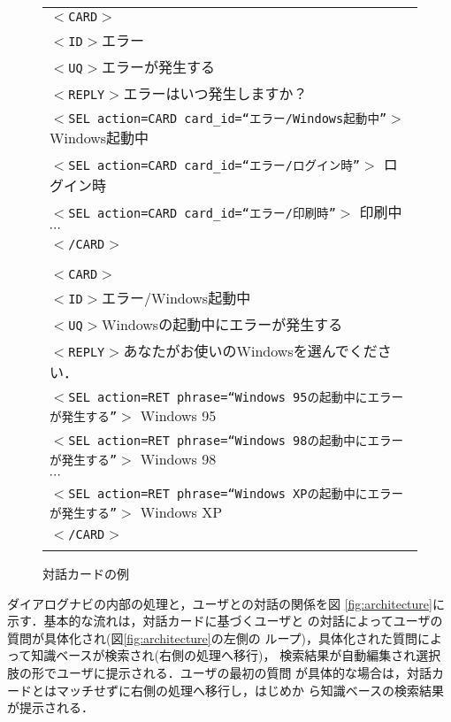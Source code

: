 \begin{itemize}
\begin{figure}[t]
 \begin{center}
  \footnotesize
   \begin{tabular}{|p{12cm}|}
    \hline
    {\tt $<$CARD$>$} \\
    {\tt $<$ID$>$}エラー \\
    {\tt $<$UQ$>$}エラーが発生する \\
    {\tt $<$REPLY$>$}エラーはいつ発生しますか？ \\
    {\tt $<$SEL action=CARD card\_id={\rm ``エラー/Windows起動中''}$>$} Windows起動中 \\
    {\tt $<$SEL action=CARD card\_id={\rm ``エラー/ログイン時''}$>$} ログイン時 \\
    {\tt $<$SEL action=CARD card\_id={\rm ``エラー/印刷時''}$>$} 印刷中 \\
    $\cdots$ \\
    {\tt $<$/CARD$>$} \\
    \\
    \hline
    \multicolumn{1}{c}{}\\
    \hline
    {\tt $<$CARD$>$} \\
    {\tt $<$ID$>$}エラー/Windows起動中 \\
    {\tt $<$UQ$>$}Windowsの起動中にエラーが発生する \\
    {\tt $<$REPLY$>$}あなたがお使いのWindowsを選んでください． \\
    {\tt $<$SEL action=RET phrase={\rm ``Windows 95の起動中にエラーが発生する''}$>$} Windows 95 \\
    {\tt $<$SEL action=RET phrase={\rm ``Windows 98の起動中にエラーが発生する''}$>$} Windows 98 \\
    $\cdots$ \\
    {\tt $<$SEL action=RET phrase={\rm ``Windows XPの起動中にエラーが発生する''}$>$} Windows XP \\
    {\tt $<$/CARD$>$} \\
    \\
    \hline
   \end{tabular}
  \caption{対話カードの例} \label{fig:対話カードの例}
 \end{center}
\end{figure}



\end{itemize}


ダイアログナビの内部の処理と，ユーザとの対話の関係を図
\ref{fig:architecture}に示す．基本的な流れは，対話カードに基づくユーザと
の対話によってユーザの質問が具体化され(図\ref{fig:architecture}の左側の
ループ)，具体化された質問によって知識ベースが検索され(右側の処理へ移行)，
検索結果が自動編集され選択肢の形でユーザに提示される．ユーザの最初の質問
が具体的な場合は，対話カードとはマッチせずに右側の処理へ移行し，はじめか
ら知識ベースの検索結果が提示される．

